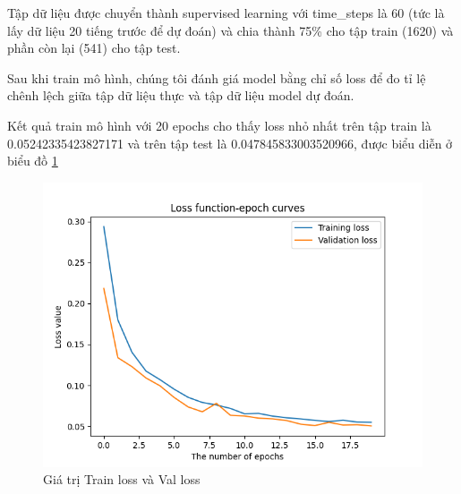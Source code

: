 Tập dữ liệu được chuyển thành supervised learning với time\_steps là 60 (tức là lấy dữ liệu 20 tiếng trước để dự đoán) và chia thành 75\% cho tập train (1620) và phần còn lại (541) cho tập test.

Sau khi train mô hình, chúng tôi đánh giá model bằng chỉ số loss để đo tỉ lệ chênh lệch giữa tập dữ liệu thực và tập dữ liệu model dự đoán.

Kết quả train mô hình với 20 epochs cho thấy loss nhỏ nhất trên tập train là 0.05242335423827171 và trên tập test là 0.047845833003520966, được biểu diễn ở biểu đồ \ref{fig:loss_chart}  
\begin{figure}[H]
    \centering
    \includegraphics[width=\textwidth]{images/Khanh/Python/Loss_Chart.png}
    \caption{Giá trị Train loss và Val loss}
    \label{fig:loss_chart}
\end{figure}

